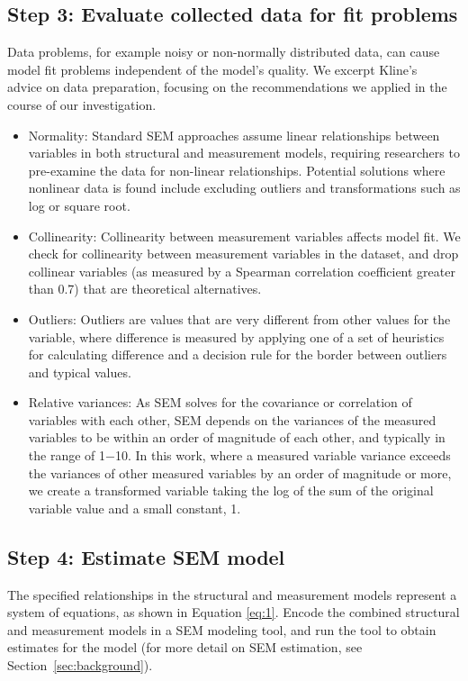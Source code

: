 \subsection{Step 3: Evaluate collected data for fit problems}
Data problems, for example noisy or non-normally distributed data, can cause model fit problems independent of the model's quality. We excerpt Kline's~\cite{kline2015principles} advice on data preparation, focusing on the recommendations we applied in the course of our investigation. 
\begin{itemize}
\item{Normality}:
Standard SEM approaches assume linear relationships between variables in both structural and measurement models, requiring researchers to pre-examine the data for non-linear relationships. Potential solutions where nonlinear data is found include excluding outliers and transformations such as log or square root.
\item{Collinearity}:
Collinearity between measurement variables affects model fit. We check for collinearity between measurement variables in the dataset, and drop collinear variables (as measured by a Spearman correlation coefficient greater than 0.7) that are theoretical alternatives. 
\item{Outliers}:
Outliers are values that are very different from other values for the variable, where difference is measured by applying one of a set of heuristics for calculating difference and a decision rule for the border between outliers and typical values. 
\item{Relative variances}:
As SEM solves for the covariance or correlation of variables with each other, SEM depends on the variances of the measured variables to be within an order of magnitude of each other, and typically in the range of 1$-$10. In this work, where a measured variable variance exceeds the variances of other measured variables by an order of magnitude or more, we create a transformed variable taking the log of the sum of the original variable value and a small constant, 1. 
\end{itemize}

\subsection{Step 4: Estimate SEM model} 
The specified relationships in the structural and measurement models represent a system of equations, as shown in Equation \ref{eq:1}. Encode the combined structural and measurement models in a SEM modeling tool, and run the tool to obtain estimates for the model (for more detail on SEM estimation, see Section~\ref{sec:background}). 

